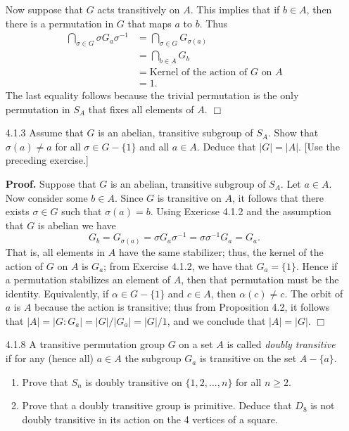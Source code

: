 \documentclass[9pt]{article}
\newcommand{\qed}{\hfill \ensuremath{\Box}}
\begin{document}
\begin{enumerate}
      Now suppose that $G$ acts transitively on $A$. This implies that if
      $b \in A$, then there is a permutation in $G$ that maps $a$ to $b$. Thus
      \begin{align*}
         \bigcap_{\sigma \in G}\sigma G_a\sigma^{-1} &=
            \bigcap_{\sigma \in G} G_{\sigma(a)} \\
            &= \bigcap_{b \in A} G_b \\
            &= \text{Kernel of the action of $G$ on $A$} \\
            &= 1.
      \end{align*}
      The last equality follows because the trivial permutation is the only
      permutation in $S_A$ that fixes all elements of $A$. \qed
   \item[4.1.3]   Assume that $G$ is an abelian, transitive subgroup of $S_A$.
                  Show that $\sigma(a) \neq a$ for all $\sigma \in G - \{1\}$
                  and all $a \in A$. Deduce that $|G| = |A|$. [Use the preceding
                  exercise.]
                  
      \textbf{Proof.} Suppose that $G$ is an abelian, transitive subgroup of
      $S_A$. Let $a \in A$. Now consider some $b \in A$. Since $G$ is transitive
      on $A$, it follows that there exists $\sigma \in G$ such that
      $\sigma(a) = b$. Using Exericse 4.1.2 and the assumption that $G$ is
      abelian we have
      $$G_b = G_{\sigma(a)} = \sigma G_a\sigma^{-1} =
        \sigma\sigma^{-1}G_a = G_a.$$
      That is, all elements in $A$ have the same stabilizer; thus, the kernel
      of the action of $G$ on $A$ is $G_a$; from Exercise 4.1.2, we have that
      $G_a = \{1\}$. Hence if a permutation stabilizes an element of $A$, then
      that permutation must be the identity. Equivalently, if
      $\alpha \in G - \{1\}$ and $c \in A$, then $\alpha(c) \neq c$. The orbit
      of $a$ is $A$ because the action is transitive; thus from Proposition 4.2,
      it follows that $|A| = |G : G_a| = |G|/|G_a| = |G|/1$, and we conclude
      that $|A| = |G|$. \qed
   \item[4.1.8]   A transitive permutation group $G$ on a set $A$ is called
                  \textit{doubly transitive} if for any (hence all) $a \in A$
                  the subgroup $G_a$ is transitive on the set $A - \{a\}$.
                  \begin{enumerate}
                     \item Prove that $S_n$ is doubly transitive on
                           $\{1, 2, \ldots, n\}$ for all $n \ge 2$.
                     \item Prove that a doubly transitive group is primitive.
                           Deduce that $D_8$ is not doubly transitive in its
                           action on the 4 vertices of a square.
                  \end{enumerate}
                  

\end{enumerate}
\end{document}
